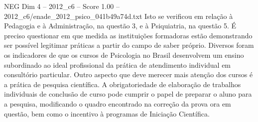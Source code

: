 \begin{textsample}{NEG Dim 4 – 2012\_c6 – Score 1.00 – 2012\_c6/enade\_2012\_psico\_041b49a74d.txt}
Isto se verificou em relação à Pedagogia e à Administração, na questão 3, e à Psiquiatria, na questão 5.
É preciso questionar em que medida as instituições formadoras estão demonstrando ser possível legitimar práticas a partir do campo de saber próprio.
Diversos foram os indicadores de que os cursos de Psicologia no Brasil desenvolvem um ensino subordinado ao ideal profissional da prática de atendimento individual em consultório particular.
Outro aspecto que deve merecer mais atenção dos cursos é a prática de pesquisa científica.
A obrigatoriedade de elaboração de trabalhos individuais de conclusão de curso pode cumprir o papel de preparar o aluno para a pesquisa, modificando o quadro encontrado na correção da prova ora em questão, bem como o incentivo à programas de Iniciação Científica.

\end{textsample}
